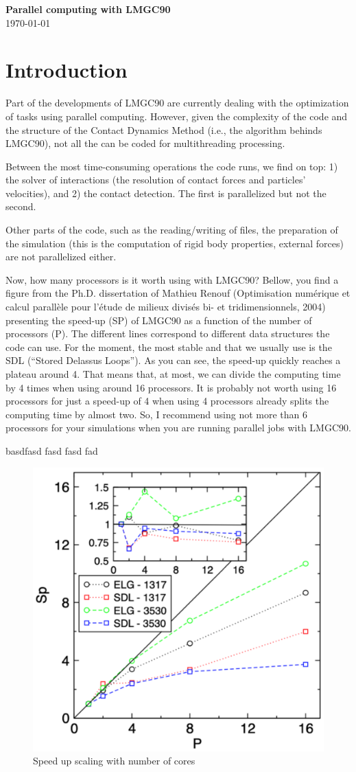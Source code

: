 \documentclass[12pt]{article}
\begin{document}
\thispagestyle{mypagestyle}

\begin{center}
  \textbf{\Large Parallel computing with LMGC90}\\
  \today
\end{center}

\section*{Introduction}
Part of the developments of LMGC90 are currently dealing with the optimization of tasks using parallel computing. However, given the complexity of the code and the structure of the Contact Dynamics Method (i.e., the algorithm behinds LMGC90), not all the can be coded for multithreading processing.

Between the most time-consuming operations the code runs, we find on top: 1) the solver of interactions (the resolution of contact forces and particles’ velocities), and 2) the contact detection. The first is parallelized but not the second.

Other parts of the code, such as the reading/writing of files, the preparation of the simulation (this is the computation of rigid body properties, external forces) are not parallelized either. 

Now, how many processors is it worth using with LMGC90? Bellow, you find a figure from the Ph.D. dissertation of Mathieu Renouf (Optimisation numérique et calcul parallèle pour l’étude de milieux divisés bi- et tridimensionnels, 2004) presenting the speed-up (SP) of LMGC90 as a function of the number of processors (P). 
The different lines correspond to different data structures the code can use. For the moment, the most stable and that we usually use is the SDL (“Stored Delassus Loops”). 
As you can see, the speed-up quickly reaches a plateau around 4. 
That means that, at most, we can divide the computing time by 4 times when using around 16 processors. It is probably not worth using 16 processors for just a speed-up of 4 when using 4 processors already splits the computing time by almost two. 
So, I recommend using not more than 6 processors for your simulations when you are running parallel jobs with LMGC90. 

basdfasd fasd fasd fad 

\begin{figure}
  \centering
  \includegraphics[width=0.5\linewidth]{figs/1_Scaling.pdf}
  \caption{Speed up scaling with number of cores}
\end{figure}
\end{document}
